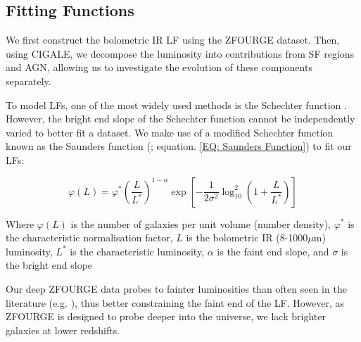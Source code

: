 \subsection{Fitting Functions}
We first construct the bolometric IR LF using the ZFOURGE dataset. Then, using CIGALE, we decompose the luminosity into contributions from SF regions and AGN, allowing us to investigate the evolution of these components separately.

To model LFs, one of the most widely used methods is the Schechter function \citep{schechter_analytic_1976}. However, the bright end slope of the Schechter function cannot be independently varied to better fit a dataset. We make use of a modified Schechter function known as the Saunders function (\citealp{saunders_60-mum_1990}; equation. \ref{EQ: Saunders Function}) to fit our LFs:

\begin{equation} 
    \varphi(L) = \varphi^* \left(\frac{L}{L^*}\right)^{1-\alpha} \exp\left[-\frac{1}{2\sigma^2}\log_{10}^2\left(1+\frac{L}{L^*}\right)\right]
    \label{EQ: Saunders Function}
\end{equation}

Where $\varphi(L)$ is the number of galaxies per unit volume (number density), $\varphi^*$ is the characteristic normalisation factor, $L$ is the bolometric IR (8-1000$\mu$m) luminosity, $L^*$ is the characteristic luminosity, $\alpha$ is the faint end slope, and $\sigma$ is the bright end slope

Our deep ZFOURGE data probes to fainter luminosities than often seen in the literature (e.g. \citealp{rodighiero_mid-_2010, gruppioni_herschel_2013}), thus better constraining the faint end of the LF. However, as ZFOURGE is designed to probe deeper into the universe, we lack brighter galaxies at lower redshifts. 





